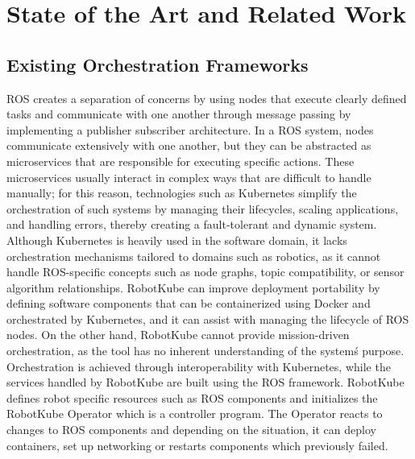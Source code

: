 \chapter{State of the Art and Related Work}

\section{Existing Orchestration Frameworks}
ROS creates a separation of concerns by using nodes that execute clearly defined tasks and communicate with one 
another through message passing by implementing a publisher subscriber architecture. In a ROS system, nodes communicate
extensively with one another, but they can be abstracted as microservices that are responsible for executing specific 
actions. These microservices usually interact in complex ways that are difficult to handle manually; for this reason, 
technologies such as Kubernetes \cite{verma2015borg} simplify the orchestration of such systems by managing their lifecycles, scaling applications,
and handling errors, thereby creating a fault-tolerant and dynamic system. Although Kubernetes is heavily used in the software domain, it lacks orchestration mechanisms tailored to domains such
as robotics, as it cannot handle ROS-specific concepts such as node graphs, topic compatibility, or sensor algorithm relationships.
RobotKube can improve deployment portability by defining software components that can be containerized using Docker \cite{merkel2014docker} and orchestrated
by Kubernetes, and it can assist with managing the lifecycle of ROS nodes. On the other hand, RobotKube cannot provide mission-driven
orchestration, as the tool has no inherent understanding of the system\'s purpose. Orchestration is achieved through interoperability
with Kubernetes, while the services handled by RobotKube are built using the ROS framework. RobotKube defines robot specific 
resources such as ROS components and initializes the RobotKube Operator which is a controller program. The Operator reacts to 
changes to ROS components and depending on the situation, it can deploy containers, set up networking or restarts components
which previously failed.

